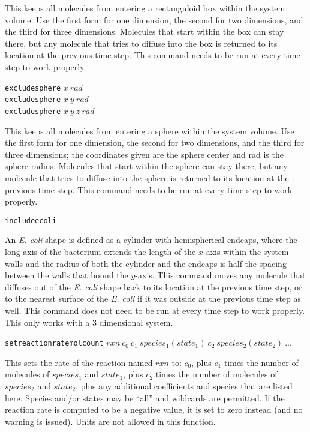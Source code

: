 \documentclass {scrbook}
\newcommand {\ttt} {\texttt}
\begin{document}
\begin{description}
This keeps all molecules from entering a rectanguloid box within the system volume. Use the first form for one dimension, the second for two dimensions, and the third for three dimensions. Molecules that start within the box can stay there, but any molecule that tries to diffuse into the box is returned to its location at the previous time step. This command needs to be run at every time step to work properly.

\item{\ttt{excludesphere} $x\ rad$\\
\ttt{excludesphere} $x\ y\ rad$\\
\ttt{excludesphere} $x\ y\ z\ rad$}

This keeps all molecules from entering a sphere within the system volume. Use the first form for one dimension, the second for two dimensions, and the third for three dimensions; the coordinates given are the sphere center and rad is the sphere radius. Molecules that start within the sphere can stay there, but any molecule that tries to diffuse into the sphere is returned to its location at the previous time step. This command needs to be run at every time step to work properly.

\item{\ttt{includeecoli}}

An \textit{E. coli} shape is defined as a cylinder with hemispherical endcaps, where the long axis of the bacterium extends the length of the $x$-axis within the system walls and the radius of both the cylinder and the endcaps is half the spacing between the walls that bound the $y$-axis. This command moves any molecule that diffuses out of the \textit{E. coli} shape back to its location at the previous time step, or to the nearest surface of the \textit{E. coli} if it was outside at the previous time step as well. This command does not need to be run at every time step to work properly. This only works with a 3 dimensional system.

\item{\ttt{setreactionratemolcount} $rxn\ c_0\ c_1\ species_1(state_1)\ c_2\ species_2(state_2)\ ...$}

This sets the rate of the reaction named $rxn$ to: $c_0$, plus $c_1$ times the number of molecules of $species_1$ and $state_1$, plus $c_2$ times the number of molecules of $species_2$ and $state_2$, plus any additional coefficients and species that are listed here. Species and/or states may be ``all'' and wildcards are permitted. If the reaction rate is computed to be a negative value, it is set to zero instead (and no warning is issued). Units are not allowed in this function.


\end{description}
\end{document}

